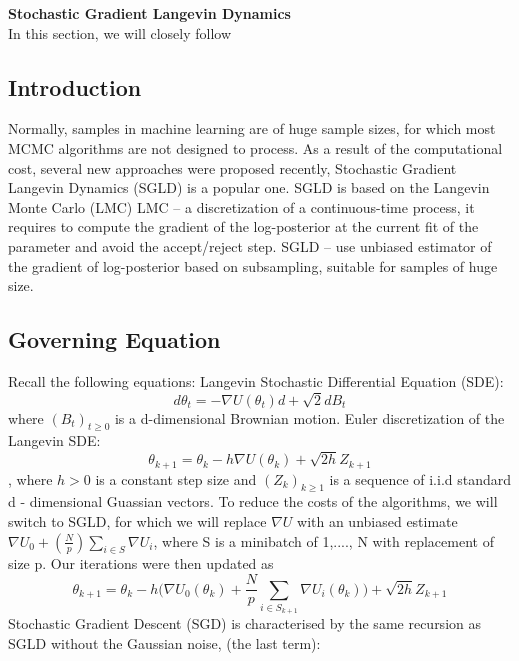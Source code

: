 






% 


\normalsize
\textbf{Stochastic Gradient Langevin Dynamics}\\
In this section, we will closely follow\cite{pitfalls}



\subsection{Introduction}

Normally, samples in machine learning are of huge sample sizes, for which most MCMC algorithms are not designed to process. 
As a result of the computational cost, several new approaches were proposed recently, Stochastic Gradient Langevin Dynamics (SGLD) is a popular one. 
SGLD is based on the Langevin Monte Carlo (LMC)
LMC – a discretization of a continuous-time process, it requires to compute the gradient of the log-posterior at the current fit of the parameter and avoid the accept/reject step.
SGLD – use unbiased estimator of the gradient of log-posterior based on subsampling, suitable for samples of huge size. 


\subsection{Governing Equation}
Recall the following equations:
Langevin Stochastic Differential Equation (SDE):$$d\theta_t = -\nabla U(\theta_t)d +\sqrt{2}d B_t$$ where $(B_t)_{t \geq 0}$ is a d-dimensional Brownian motion. 
Euler discretization of the Langevin SDE:
$$\theta_{k+1} = \theta_k - h \nabla U(\theta_k)+\sqrt{2h} Z_{k+1}$$, where $h > 0$ is a constant step size and $(Z_k)_{k\geq1}$ is a sequence of i.i.d standard d - dimensional Guassian vectors. 
To reduce the costs of the algorithms, we will switch to SGLD, for which we will replace $\nabla U$ with an unbiased estimate $\nabla U_0+(\frac{N}{p}) \sum_{i\in S}\nabla U_i$, where S is a minibatch of {1,...., N} with replacement of size p. Our iterations were then updated as
$$\theta_{k+1} = \theta_{k}-h \Bigg (\nabla U_0(\theta_k)+\frac{N}{p}\sum_{i\in S_{k+1}}\nabla U_i(\theta_k)\Bigg )+\sqrt{2h}Z_{k+1}$$
Stochastic Gradient Descent (SGD) is characterised by the same recursion as SGLD without the Gaussian noise, (the last term):


